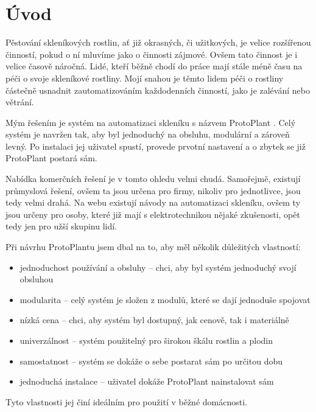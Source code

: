 \chapter*{Úvod}

Pěstování skleníkových rostlin, ať již okrasných, či užitkových, je velice roz\-ší\-řenou činností, pokud o ní mluvíme jako o činnosti zájmové.
Ovšem tato činnost je i velice časově náročná.
Lidé, kteří běžně chodí do práce mají stále méně času na péči o svoje skleníkové rostliny.
Mojí snahou je těmto lidem péči o rostliny částečně usnadnit zautomatizováním každodenních činností, jako je zalévání nebo větrání.

Mým řešením je systém na automatizaci skleníku s názvem ProtoPlant \cite{protoPlantWeb}.
Celý systém je navržen tak, aby byl jednoduchý na obsluhu, modulární a zároveň levný.
Po instalaci jej uživatel spustí, provede prvotní nastavení a o zbytek se již ProtoPlant postará sám.

Nabídka komerčních řešení je v tomto ohledu velmi chudá.
Samořejmě, existují průmyslová řešení, ovšem ta jsou určena pro firmy, nikoliv pro jednotlivce, jsou tedy velmi drahá.
Na webu existují návody na automatizaci skleníku, ovšem ty jsou určeny pro osoby, které již mají s elektrotechnikou nějaké zkušenosti, opět tedy jen pro užší skupinu lidí.

Při návrhu ProtoPlantu jsem dbal na to, aby měl několik důležitých vlastností:
\begin{itemize}
    \item jednoduchost používání a obsluhy -- chci, aby byl systém jednoduchý svojí obsluhou
    \item modularita -- celý systém je složen z modulů, které se dají jednoduše spojovat
    \item nízká cena -- chci, aby systém byl dostupný, jak cenově, tak i materiálně
    \item univerzálnost -- systém použitelný pro širokou škálu rostlin a plodin
    \item samostatnost -- systém se dokáže o sebe postarat sám po určitou dobu
    \item jednoduchá instalace -- uživatel dokáže ProtoPlant nainstalovat sám
\end{itemize}

Tyto vlastnosti jej činí ideálním pro použití v běžné domácnosti.

\newpage
